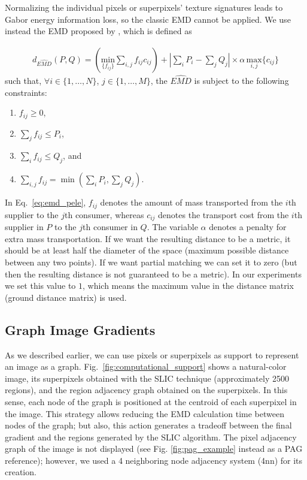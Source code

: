 Normalizing the individual pixels or superpixels' texture signatures leads to Gabor energy information loss, so the classic EMD cannot be applied. We use instead the EMD proposed by \citep{Pele.Werman:ECCV:2008}, which is defined as 

\begin{eqnarray}
d_{\widehat{EMD}}(P, Q) = \left( \underset{\{f_{ij}\}}{\mathrm{min}}\sum_{i,j}f_{ij}c_{ij}\right)
+ \left\vert \sum_{i} P_i - \sum_{j} Q_j \right\vert \times \alpha\, \underset{{i,j}}{\mathrm{max}} \{c_{ij}\}   \label{eq:emd_pele} 
\end{eqnarray}
such that, $\forall i \in\{1, \ldots, N\}$, $j \in\{1, \ldots, M\}$, the $\widehat{EMD}$ is subject to the following constraints:

\begin{enumerate}%
 \item $f_{ij} \geq 0$,
 \item $\sum_{j}f_{ij}\leq P_i$,
 \item $\sum_{i}f_{ij}\leq Q_j$, and
 \item $\sum_{i,j}f_{ij} = \min \left( \sum_{i}P_i, \sum_{j}Q_j \right)$.
\end{enumerate}  

In Eq.\ \eqref{eq:emd_pele}, $f_{ij}$ denotes the amount of mass transported from the $i$th supplier to the $j$th consumer, whereas $c_{ij}$ denotes the transport cost from the $i$th supplier in $P$ to the $j$th consumer in $Q$. The variable $\alpha$ denotes a penalty for extra mass transportation. If we want the resulting distance to be a metric, it should be at least half the diameter of the space (maximum possible distance between any two points). If we want partial matching we can set it to zero (but then the resulting distance is not guaranteed to be a metric). In our experiments we set this value to $1$, which means the maximum value in the distance matrix (ground distance matrix) is used.

\subsection{Graph Image Gradients}
As we described earlier, we can use pixels or superpixels as support to represent an image as a graph. Fig.\ \ref{fig:computational_support} shows a natural-color image, its superpixels obtained with the SLIC technique (approximately 2500 regions), and the region adjacency graph obtained on the superpixels. In this sense, each node of the graph is positioned at the centroid of each superpixel in the image. This strategy allows reducing the EMD calculation time between nodes of the graph; but also, this action generates a tradeoff between the final gradient and the regions generated by the SLIC algorithm. The pixel adjacency graph of the image is not displayed (see Fig. \ref{fig:pag_example} instead as a PAG reference); however, we used a 4 neighboring node adjacency system (4nn) for its creation.

